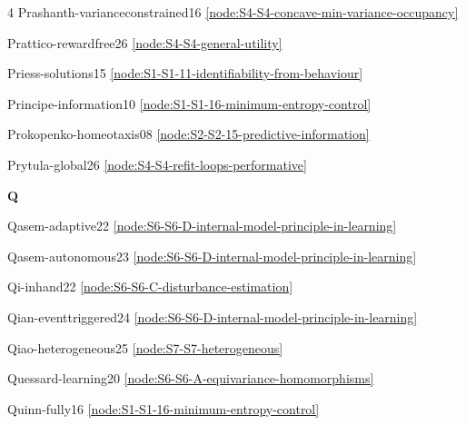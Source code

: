 \documentclass[10pt]{article}
\begin{document}
{\begin{multicols}{4}
Prashanth-varianceconstrained16 \hfill \ref{node:S4-S4-concave-min-variance-occupancy}\par
Prattico-rewardfree26 \hfill \ref{node:S4-S4-general-utility}\par
Priess-solutions15 \hfill \ref{node:S1-S1-11-identifiability-from-behaviour}\par
Principe-information10 \hfill \ref{node:S1-S1-16-minimum-entropy-control}\par
Prokopenko-homeotaxis08 \hfill \ref{node:S2-S2-15-predictive-information}\par
Prytula-global26 \hfill \ref{node:S4-S4-refit-loops-performative}\par

\smallskip\textbf{Q}\par
Qasem-adaptive22 \hfill \ref{node:S6-S6-D-internal-model-principle-in-learning}\par
Qasem-autonomous23 \hfill \ref{node:S6-S6-D-internal-model-principle-in-learning}\par
Qi-inhand22 \hfill \ref{node:S6-S6-C-disturbance-estimation}\par
Qian-eventtriggered24 \hfill \ref{node:S6-S6-D-internal-model-principle-in-learning}\par
Qiao-heterogeneous25 \hfill \ref{node:S7-S7-heterogeneous}\par
Quessard-learning20 \hfill \ref{node:S6-S6-A-equivariance-homomorphisms}\par
Quinn-fully16 \hfill \ref{node:S1-S1-16-minimum-entropy-control}\par


\end{multicols}}
\end{document}
